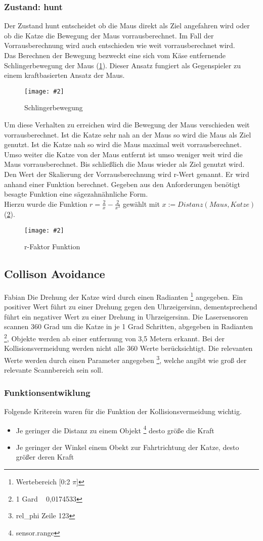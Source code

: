 \documentclass[
a4paper,     %
12pt         %
]{scrartcl}  %
\newcommand{\mygraphics}[3]{
\begin{figure}[!h]
  \begin{center}
    \texttt{[image: \#2]} \\    
    \caption{#3}\label{fig:#2}
  \end{center}
\end{figure}

}
\begin{document}
\subsubsection{Zustand: \glqq hunt\grqq{}}
\label{hunt}
Der Zustand \glqq hunt\grqq{} entscheidet ob die Maus direkt als Ziel angefahren wird oder ob die Katze die Bewegung der Maus vorrausberechnet. Im Fall der Vorrausberechnung wird auch entschieden wie weit vorrausberechnet wird.\\
Das Berechnen der Bewegung bezweckt eine sich vom Käse entfernende Schlingerbewegung der Maus (\ref{fig:ziel.png}).
Dieser Ansatz fungiert als Gegenspieler zu einem kraftbasierten Ansatz der Maus. 
\mygraphics{0.6\textwidth}{ziel.png}{Schlingerbewegung}
Um diese Verhalten zu erreichen wird die Bewegung der Maus verschieden weit vorrausberechnet.
Ist die Katze sehr nah an der Maus so wird die Maus als Ziel genutzt. Ist die Katze nah so wird die Maus maximal weit vorrausberechnet. Umso weiter die Katze von der Maus entfernt ist umso weniger weit wird die Maus vorrausberechnet.
Bis schließlich die Maus wieder als Ziel genutzt wird.\\
\clearpage
Den Wert der Skalierung der Vorrausberechnung wird r-Wert genannt. Er wird anhand einer Funktion berechnet.
Gegeben aus den Anforderungen benötigt besagte Funktion eine sägezahnähnliche Form.\\Hierzu wurde die Funktion $r= \frac{2}{x} - \frac{2}{x^3}$
gewählt mit $x := Distanz(Maus,Katze)$  (\ref{fig:huntFunction.png}).
\mygraphics{0.9\textwidth}{huntFunction.png}{r-Faktor Funktion}
\clearpage
\subsection{Collison Avoidance}
Fabian
Die Drehung der Katze wird durch einen Radianten \footnote {Wertebereich [0:2 $\pi$]} angegeben. Ein positiver Wert führt zu einer Drehung gegen den Uhrzeigersinn, dementsprechend führt ein negativer Wert zu einer Drehung in Uhrzeigersinn.
Die Lasersensoren scannen 360 Grad um die Katze in je 1 Grad Schritten, abgegeben in Radianten \footnote {1 Gard ~ 0,0174533}, Objekte werden ab einer entfernung von 3,5 Metern erkannt. 
Bei der Kollisionsvermeidung werden nicht alle 360 Werte berücksichtigt. Die relevanten Werte werden durch einen Parameter angegeben \footnote {rel\_phi Zeile 123}, welche angibt wie groß der relevante Scannbereich sein soll.

\subsubsection{Funktionsentwiklung}
Folgende Kriterein waren für die Funktion der Kollisionsvermeidung wichtig.
\begin{itemize}
\item Je geringer die Distanz zu einem Objekt \footnote {sensor.range} desto größe die Kraft
\item Je geringer der Winkel einem Obekt zur Fahrtrichtung der Katze, desto größer deren Kraft
\end{itemize}
\end{document}
